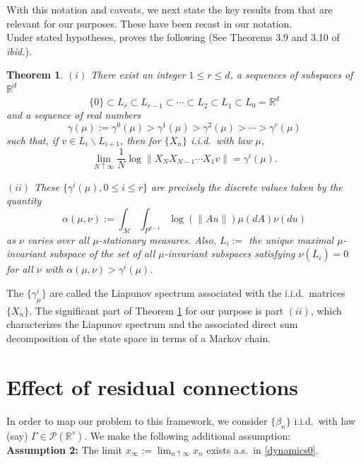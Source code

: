 \documentclass[10pt,a4paper]{amsart}
\newtheorem{theorem}{Theorem}[section]
\newcommand{\R}{\mathbb{R}}
\newcommand{\M}{\mathcal{M}}
\newcommand{\PA}{\mathcal{P}}
\newcommand{\0}{\textbf{0}}
\begin{document}
\medskip

With this notation and caveats, we next state the key results from \cite{FK} that are relevant for our purposes. These have been recast in our notation.\\

Under stated hypotheses, \cite{FK} proves the following (See Theorems 3.9 and 3.10 of \textit{ibid.}).

\begin{theorem}\label{FuKe} $(i)$ There exist an integer $1 \leq r \leq d$, a sequences of subspaces of $\R^d$
$$\{0\} \subset L_r \subset L_{r-1} \subset \cdots \subset L_2 \subset L_1 \subset L_0 = \R^d$$
and a sequence of real numbers
$$\gamma(\mu) := \gamma^0(\mu) > \gamma^1(\mu) > \gamma^2(\mu) > \cdots > \gamma^r(\mu)$$
such that, if $v\in L_i\backslash L_{i+1}$, then for $\{X_n\}$ i.i.d.\ with law $\mu$,
$$\lim_{N\uparrow\infty}\frac{1}{N}\log\left\|X_NX_{N-1}\cdots X_1v\right\| = \gamma^i(\mu).$$

$(ii)$ These $\{\gamma^i(\mu), 0 \leq i \leq r\}$ are precisely the discrete values taken by the quantity
\begin{equation}
\alpha(\mu,\nu) := \int_\M\int_{P^{d-1}}\log\left(\|Au\|\right)\mu(dA)\nu(du) \label{alpha}
\end{equation}
as $\nu$ varies over all $\mu$-stationary measures. Also, $L_i :=$ the unique maximal $\mu$-invariant subspace of the set of all $\mu$-invariant subspaces satisfying $\nu(\overline{L}_i) = 0$ for all $\nu$ with $\alpha(\mu,\nu) > \gamma^i(\mu)$.
\end{theorem}

The $\{\gamma^i_\mu\}$ are called the Liapunov spectrum associated with the i.i.d.\ matrices $\{X_n\}$. The significant part of Theorem \ref{FuKe} for our purpose is part $(ii)$, which characterizes the Liapunov spectrum and the associated direct sum decomposition of the state space in terms of a Markov chain.\\

\section{Effect of residual connections}\label{resnet}

In order to map our problem to this framework, we consider $\{\beta_n\}$ i.i.d.\ with law (say) $\Gamma \in \PA(\R^s)$. We make the following additional assumption:\\

\noindent \textbf{Assumption 2:} The limit $x_\infty := \lim_{n\uparrow\infty}x_n$ exists a.s.\ in \eqref{dynamics0}.\\
\end{document}
